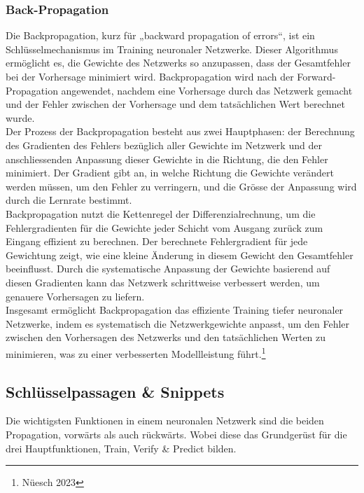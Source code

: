 \subsubsection{Back-Propagation}
\label{sec:RealBackPropagation}
Die Backpropagation, kurz für „backward propagation of errors“, ist ein Schlüsselmechanismus im Training neuronaler Netzwerke. Dieser Algorithmus ermöglicht es, die Gewichte des Netzwerks so anzupassen, dass der Gesamtfehler bei der Vorhersage minimiert wird. Backpropagation wird nach der Forward-Propagation angewendet, nachdem eine Vorhersage durch das Netzwerk gemacht und der Fehler zwischen der Vorhersage und dem tatsächlichen Wert berechnet wurde.
\\
Der Prozess der Backpropagation besteht aus zwei Hauptphasen: der Berechnung des Gradienten des Fehlers bezüglich aller Gewichte im Netzwerk und der anschliessenden Anpassung dieser Gewichte in die Richtung, die den Fehler minimiert. Der Gradient gibt an, in welche Richtung die Gewichte verändert werden müssen, um den Fehler zu verringern, und die Grösse der Anpassung wird durch die Lernrate bestimmt.
\\
Backpropagation nutzt die Kettenregel der Differenzialrechnung, um die Fehlergradienten für die Gewichte jeder Schicht vom Ausgang zurück zum Eingang effizient zu berechnen. Der berechnete Fehlergradient für jede Gewichtung zeigt, wie eine kleine Änderung in diesem Gewicht den Gesamtfehler beeinflusst. Durch die systematische Anpassung der Gewichte basierend auf diesen Gradienten kann das Netzwerk schrittweise verbessert werden, um genauere Vorhersagen zu liefern.
\\
Insgesamt ermöglicht Backpropagation das effiziente Training tiefer neuronaler Netzwerke, indem es systematisch die Netzwerkgewichte anpasst, um den Fehler zwischen den Vorhersagen des Netzwerks und den tatsächlichen Werten zu minimieren, was zu einer verbesserten Modellleistung führt.\footnote{Nüesch 2023}

\subsection{Schlüsselpassagen \& Snippets} %
Die wichtigsten Funktionen in einem neuronalen Netzwerk sind die beiden Propagation, vorwärts als auch rückwärts. Wobei diese das Grundgerüst für die drei Hauptfunktionen, Train, Verify \& Predict bilden.

